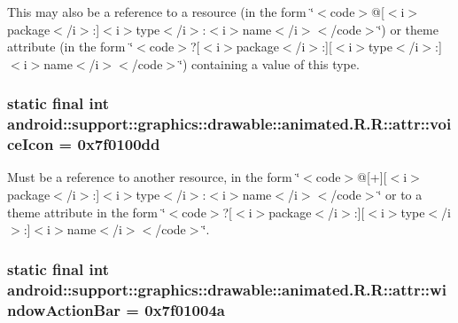 This may also be a reference to a resource (in the form \char`\"{}$<$code$>$@\mbox{[}$<$i$>$package$<$/i$>$:\mbox{]}$<$i$>$type$<$/i$>$:$<$i$>$name$<$/i$>$$<$/code$>$\char`\"{}) or theme attribute (in the form \char`\"{}$<$code$>$?\mbox{[}$<$i$>$package$<$/i$>$:\mbox{]}\mbox{[}$<$i$>$type$<$/i$>$:\mbox{]}$<$i$>$name$<$/i$>$$<$/code$>$\char`\"{}) containing a value of this type. \hypertarget{classandroid_1_1support_1_1graphics_1_1drawable_1_1animated_1_1_r_1_1attr_b70890b63b9726b4f4ed50d154841f83}{
\subsubsection[{voiceIcon}]{\setlength{\rightskip}{0pt plus 5cm}static final int android::support::graphics::drawable::animated.R.R::attr::voiceIcon = 0x7f0100dd}}
\label{classandroid_1_1support_1_1graphics_1_1drawable_1_1animated_1_1_r_1_1attr_b70890b63b9726b4f4ed50d154841f83}


Must be a reference to another resource, in the form \char`\"{}$<$code$>$@\mbox{[}+\mbox{]}\mbox{[}$<$i$>$package$<$/i$>$:\mbox{]}$<$i$>$type$<$/i$>$:$<$i$>$name$<$/i$>$$<$/code$>$\char`\"{} or to a theme attribute in the form \char`\"{}$<$code$>$?\mbox{[}$<$i$>$package$<$/i$>$:\mbox{]}\mbox{[}$<$i$>$type$<$/i$>$:\mbox{]}$<$i$>$name$<$/i$>$$<$/code$>$\char`\"{}. \hypertarget{classandroid_1_1support_1_1graphics_1_1drawable_1_1animated_1_1_r_1_1attr_1dec89d4fe18ec758d96a11b04b025be}{
\subsubsection[{windowActionBar}]{\setlength{\rightskip}{0pt plus 5cm}static final int android::support::graphics::drawable::animated.R.R::attr::windowActionBar = 0x7f01004a}}
\label{classandroid_1_1support_1_1graphics_1_1drawable_1_1animated_1_1_r_1_1attr_1dec89d4fe18ec758d96a11b04b025be}


